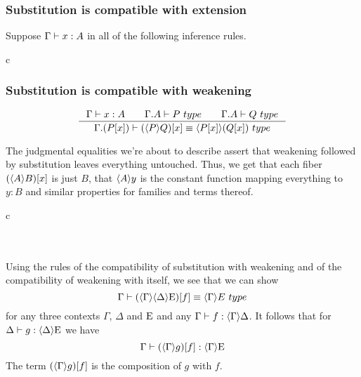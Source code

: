 \subsubsection{Substitution is compatible with extension}
Suppose $\jterm{\Gamma}{A}{x}$ in all of the following inference rules.
\begin{infarray}{c}
  {}\\
  {}
\end{infarray}

\subsubsection{Substitution is compatible with weakening}
\begin{equation*}
\inference{\jterm{\Gamma}{A}{x}\qquad\jtype{\ctxext{\Gamma}{A}}{P}\qquad\jtype{\ctxext{\Gamma}{A}}{Q}}
          {\jtypeeq{\ctxext{\Gamma}{\subst{x}{P}}}{\subst{x}{\ctxwk{P}{Q}}}{\ctxwk{\subst{x}{P}}{\subst{x}{Q}}}}
\end{equation*}

The judgmental equalities we're about to describe assert that weakening followed
by substitution leaves everything untouched. Thus, we get that each fiber
$\subst{x}{\ctxwk{A}{B}}$ is just $B$, that $\ctxwk{A}{y}$ is the constant function
mapping everything to $y:B$ and similar properties for families and terms thereof.

\begin{infarray}{c}
\\
\\
\\
\end{infarray}

Using the rules of the compatibility of substitution with weakening and of the
compatibility of weakening with itself, we see that we can show
\begin{equation*}
\jtypeeq{\Gamma}{\subst{f}{\ctxwk{\Gamma}{{\Delta}{\greek{E}}}}}{\ctxwk{\Gamma}{E}}
\end{equation*}
for any three contexts $\Gamma$, $\Delta$ and $\mathrm{E}$ and any $\jhom{\Gamma}{\Delta}{f}$.
It follows that for $\jhom{\Delta}{\greek{E}}{g}$ we have
\begin{equation*}
\jhom{\Gamma}{\greek{E}}{\subst{f}{\ctxwk{\Gamma}{g}}}
\end{equation*}
The term $\jcomp{\Gamma}{f}{g}$ is the composition of $g$ with $f$.

